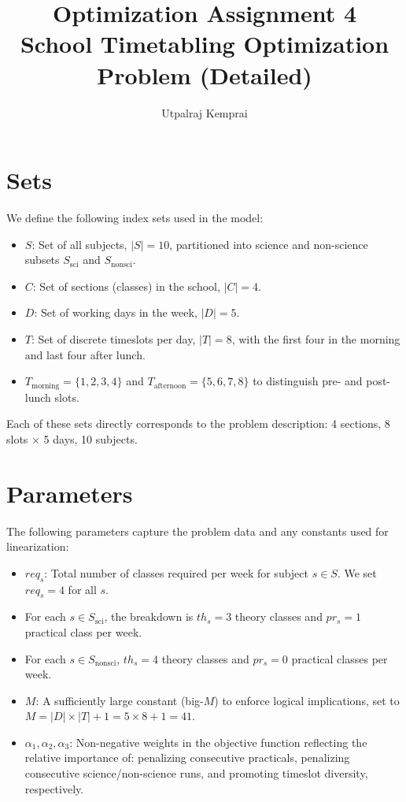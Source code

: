 \documentclass[11pt]{article}
\begin{document}
\title{Optimization Assignment 4 \\ School Timetabling Optimization Problem (Detailed)}
\author{Utpalraj Kemprai}
\date{}
\maketitle

\section{Sets}
We define the following index sets used in the model:
\begin{itemize}
  \item $S$: Set of all subjects, $|S|=10$, partitioned into science and non-science subsets $S_{\mathrm{sci}}$ and $S_{\mathrm{nonsci}}$.  
  \item $C$: Set of sections (classes) in the school, $|C|=4$.  
  \item $D$: Set of working days in the week, $|D|=5$.  
  \item $T$: Set of discrete timeslots per day, $|T|=8$, with the first four in the morning and last four after lunch.  
  \item $T_{\mathrm{morning}}=\{1,2,3,4\}$ and $T_{\mathrm{afternoon}}=\{5,6,7,8\}$ to distinguish pre- and post-lunch slots.
\end{itemize}

Each of these sets directly corresponds to the problem description: 4 sections, 8 slots × 5 days, 10 subjects.

\section{Parameters}
The following parameters capture the problem data and any constants used for linearization:
\begin{itemize}
  \item $req_s$: Total number of classes required per week for subject $s\in S$.  We set $req_s=4$ for all $s$.  
  \item For each $s\in S_{\mathrm{sci}}$, the breakdown is $th_s=3$ theory classes and $pr_s=1$ practical class per week.  
  \item For each $s\in S_{\mathrm{nonsci}}$, $th_s=4$ theory classes and $pr_s=0$ practical classes per week.  
  \item $M$: A sufficiently large constant (big-$M$) to enforce logical implications, set to $M = |D|\times|T| + 1 = 5\times8 + 1 = 41$.  
  \item $\alpha_1,\alpha_2,\alpha_3$: Non-negative weights in the objective function reflecting the relative importance of: penalizing consecutive practicals, penalizing consecutive science/non-science runs, and promoting timeslot diversity, respectively.
\end{itemize}
\end{document}
